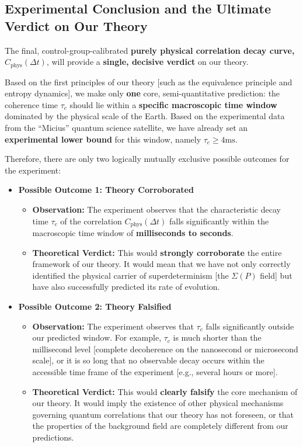 \documentclass[11pt]{article}
\begin{document}
\subsection{Experimental Conclusion and the Ultimate Verdict on Our Theory}
The final, control-group-calibrated \textbf{purely physical correlation decay curve, $C_{\text{phys}}(\Delta t)$}, will provide a \textbf{single, decisive verdict} on our theory.

Based on the first principles of our theory [such as the equivalence principle and entropy dynamics], we make only \textbf{one} core, semi-quantitative prediction: the coherence time $\tau_c$ should lie within a \textbf{specific macroscopic time window} dominated by the physical scale of the Earth. Based on the experimental data from the ``Micius'' quantum science satellite, we have already set an \textbf{experimental lower bound} for this window, namely $\tau_c \geq 4\text{ms}$.

Therefore, there are only two logically mutually exclusive possible outcomes for the experiment:

\begin{itemize}
    \item   \textbf{Possible Outcome 1: Theory Corroborated}
    \begin{itemize}
        \item   \textbf{Observation:} The experiment observes that the characteristic decay time $\tau_c$ of the correlation $C_{\text{phys}}(\Delta t)$ falls significantly within the macroscopic time window of \textbf{milliseconds to seconds}.
        \item   \textbf{Theoretical Verdict:} This would \textbf{strongly corroborate} the entire framework of our theory. It would mean that we have not only correctly identified the physical carrier of superdeterminism [the $\Sigma(P)$ field] but have also successfully predicted its rate of evolution.
    \end{itemize}

    \item   \textbf{Possible Outcome 2: Theory Falsified}
    \begin{itemize}
        \item   \textbf{Observation:} The experiment observes that $\tau_c$ falls significantly outside our predicted window. For example, $\tau_c$ is much shorter than the millisecond level [complete decoherence on the nanosecond or microsecond scale], or it is so long that no observable decay occurs within the accessible time frame of the experiment [e.g., several hours or more].
        \item   \textbf{Theoretical Verdict:} This would \textbf{clearly falsify} the core mechanism of our theory. It would imply the existence of other physical mechanisms governing quantum correlations that our theory has not foreseen, or that the properties of the background field are completely different from our predictions.
    \end{itemize}
\end{itemize}
\end{document}
